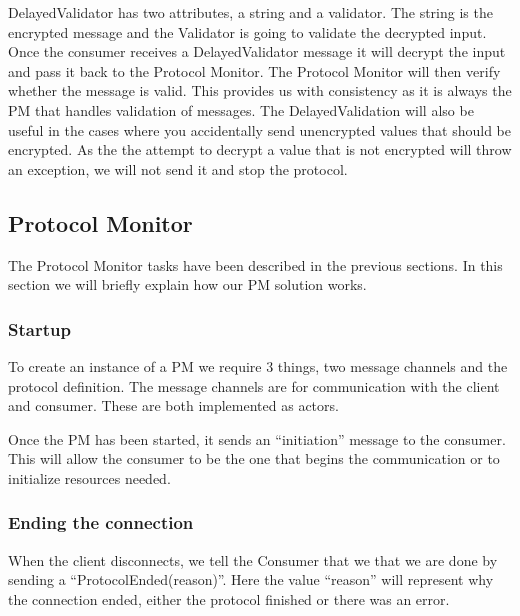 DelayedValidator has two attributes, a string and a validator. The string is the encrypted message and the Validator is going to validate the decrypted input. Once the consumer receives a DelayedValidator message it will decrypt the input and pass it back to the Protocol Monitor. The Protocol Monitor will then verify whether the message is valid. This provides us with consistency as it is always the PM that handles validation of messages. The DelayedValidation will also be useful in the cases where you accidentally send unencrypted values that should be encrypted. As the the attempt to decrypt a value that is not encrypted will throw an exception, we will not send it and stop the protocol.
   
%


\subsection{Protocol Monitor}
The Protocol Monitor tasks have been described in the previous sections. In this section we will briefly explain how our PM solution works.
\subsubsection{Startup}
To create an instance of a PM we require 3 things, two message channels and the protocol definition. The message channels are for communication with the client and consumer. These are both implemented as actors. 

Once the PM has been started, it sends an ``initiation'' message to the consumer. This will allow the consumer to be the one that begins the communication or to initialize resources needed.

\subsubsection{Ending the connection}
When the client disconnects, we tell the Consumer that we that we are done by sending a ``ProtocolEnded(reason)''. Here the value ``reason'' will represent why the connection ended, either the protocol finished or there was an error.

%





